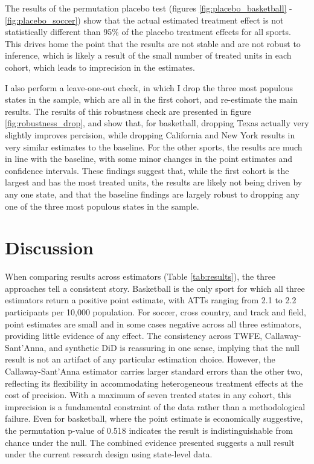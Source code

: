 \documentclass[11pt]{article}
\newcommand{\1}[1]{\mathbb{I}\{#1\}}
\theoremstyle{plain}
\begin{document}
The results of the permutation placebo test (figures \ref{fig:placebo_basketball} - \ref{fig:placebo_soccer}) show that the actual estimated treatment effect is not statistically different than 95\% of the placebo treatment effects for all sports. This drives home the point that the results are not stable and are not robust to inference, which is likely a result of the small number of treated units in each cohort, which leads to imprecision in the estimates.

I also perform a leave-one-out check, in which I drop the three most populous states in the sample, which are all in the first cohort, and re-estimate the main results. The results of this robustness check are presented in figure \ref{fig:robustness_drop}, and show that, for basketball, dropping Texas actually very slightly improves percision, while dropping California and New York results in very similar estimates to the baseline. For the other sports, the results are much in line with the baseline, with some minor changes in the point estimates and confidence intervals.  These findings suggest that, while the first cohort is the largest and has the most treated units, the results are likely not being driven by any one state, and that the baseline findings are largely robust to dropping any one of the three most populous states in the sample.

\section{Discussion}

When comparing results across estimators (Table \ref{tab:results}), the three approaches tell a consistent story. Basketball is the only sport for which all three estimators return a positive point estimate, with ATTs ranging from 2.1 to 2.2 participants per 10,000 population. For soccer, cross country, and track and field, point estimates are small and in some cases negative across all three estimators, providing little evidence of any effect. The consistency across TWFE, Callaway-Sant'Anna, and synthetic DiD is reassuring in one sense, implying that the null result is not an artifact of any particular estimation choice. However, the Callaway-Sant'Anna estimator carries larger standard errors than the other two, reflecting its flexibility in accommodating heterogeneous treatment effects at the cost of precision. With a maximum of seven treated states in any cohort, this imprecision is a fundamental constraint of the data rather than a methodological failure. Even for basketball, where the point estimate is economically suggestive, the permutation p-value of 0.518 indicates the result is indistinguishable from chance under the null. The combined evidence presented suggests a null result under the current research design using state-level data.
\end{document}
